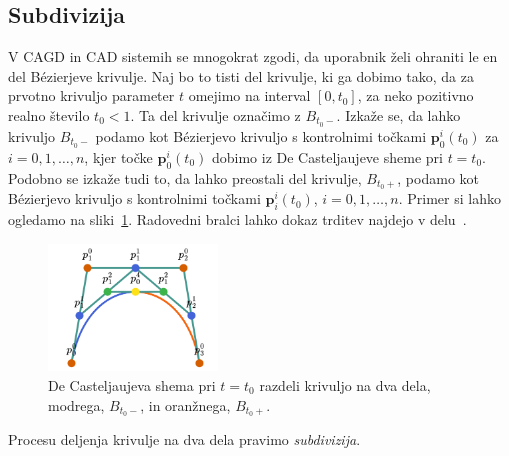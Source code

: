\documentclass[isrm2, tisk]{fmfdelo}
\newcommand{\p}{\mathbf{p}}
\begin{document}
    \subsection{Subdivizija}
    V CAGD in CAD sistemih se mnogokrat zgodi, da uporabnik želi ohraniti le en del Bézierjeve krivulje.
    Naj bo to tisti del krivulje, ki ga dobimo tako, da za prvotno krivuljo parameter $t$ omejimo na interval $[0,t_0]$, za neko pozitivno realno število $t_0<1$.
    Ta del krivulje označimo z $B_{t_0-}$.
    Izkaže se, da lahko krivuljo $B_{t_0-}$ podamo kot Bézierjevo krivuljo s kontrolnimi točkami $\p_0^i(t_0)$ za $i=0,1,\ldots,n$, kjer točke $\p_0^i(t_0)$ dobimo iz De Casteljaujeve sheme pri $t=t_0$.
    Podobno se izkaže tudi to, da lahko preostali del krivulje, $B_{t_0+}$, podamo kot Bézierjevo krivuljo s kontrolnimi točkami $\p_i^i(t_0)$,  $i=0,1,\ldots,n$.
    Primer si lahko ogledamo na sliki~\ref{fig:subdivizija}.
    Radovedni bralci lahko dokaz trditev najdejo v delu~\cite{placeholder}.
    \begin{figure}[h]
        \centering
        \includegraphics[width=0.4\textwidth]{images/subdivizija}
        \caption{De Casteljaujeva shema pri $t=t_0$ razdeli krivuljo na dva dela, modrega, $B_{t_0-}$, in oranžnega, $B_{t_0+}$. }
        \label{fig:subdivizija}
    \end{figure}
    Procesu deljenja krivulje na dva dela pravimo \textit{subdivizija}.
\end{document}
